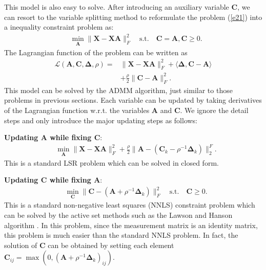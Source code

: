 \documentclass[10pt,twocolumn,letterpaper]{article}
\begin{document}
This model is also easy to solve. After introducing an auxiliary variable $\bm{C}$, we can resort to the variable splitting method to reformulate the problem (\ref{e21}) into a inequality constraint problem as:
\begin{equation}
\begin{split}
\label{e22}
&
\min_{\bm{A}}
\|
\bm{X}
-
\bm{X}\bm{A}
\|_{F}^{2}
\quad 
\text{s.t.}
\quad
\bm{C}=\bm{A}
,
\bm{C}\ge0
.
\end{split}
\end{equation}
The Lagrangian function of the problem can be written as 
\begin{equation}
\begin{split}
\label{e23}
\mathcal{L}(\bm{A},\bm{C},\bm{\Delta},\rho)
=
&
\|
\bm{X}
-
\bm{X}\bm{A}
\|_{F}^{2}
+
\langle
\bm{\Delta},\bm{C}-\bm{A}
\rangle
\\
&
+
\frac{\rho}{2}
\|
\bm{C}
-
\bm{A}
\|_{F}^{2}
.
\end{split}
\end{equation}
This model can be solved by the ADMM algorithm, just similar to those problems in previous sections. Each variable can be updated by taking derivatives of the Lagrangian function w.r.t. the variables $\bm{A}$ and $\bm{C}$. We ignore the detail steps and only introduce the major updating steps as follows:

\textbf{Updating $\bm{A}$ while fixing $\bm{C}$}:
\begin{equation}
\begin{split}
\label{e24}
&
\min_{\bm{A}}
\|
\bm{X}
-
\bm{X}\bm{A}
\|_{F}^{2}
+
\frac{\rho}{2}
\|
\bm{A}
-
(
\bm{C}_{k}
-
\rho^{-1}
\bm{\Delta}_{k}
)
\|_{2}^{F}
.
\end{split}
\end{equation}
This is a standard LSR problem which can be solved in closed form.

\textbf{Updating $\bm{C}$ while fixing $\bm{A}$}:
\begin{equation}
\begin{split}
\label{e25}
&
\min_{\bm{C}}
\|
\bm{C}
-
(
\bm{A}
+
\rho^{-1}
\bm{\Delta}_{k}
)
\|_{F}^{2}
\quad 
\text{s.t.}
\quad
\bm{C}\ge0
.
\end{split}
\end{equation}
This is a standard non-negative least squares (NNLS) constraint problem which can be solved by the active set methods such as  the Lawson and Hanson algorithm \cite{lawsonhanson}. In this problem, since the measurement matrix is an identity matrix, this problem is much easier than the standard NNLS problem. In fact, the solution of $\bm{C}$ can be obtained by setting each element $\bm{C}_{ij}=\max(0,(\bm{A}+\rho^{-1}\bm{\Delta}_{k})_{ij})$.
\end{document}

